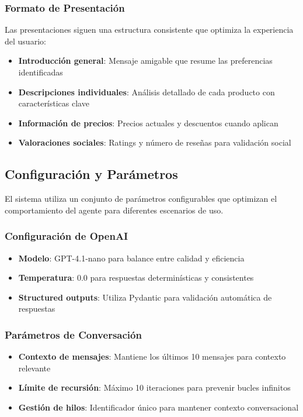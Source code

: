 \subsubsection{Formato de Presentación}

Las presentaciones siguen una estructura consistente que optimiza la experiencia del usuario:

\begin{itemize}
    \item \textbf{Introducción general}: Mensaje amigable que resume las preferencias identificadas
    \item \textbf{Descripciones individuales}: Análisis detallado de cada producto con características clave
    \item \textbf{Información de precios}: Precios actuales y descuentos cuando aplican
    \item \textbf{Valoraciones sociales}: Ratings y número de reseñas para validación social
\end{itemize}

\subsection{Configuración y Parámetros}

El sistema utiliza un conjunto de parámetros configurables que optimizan el comportamiento del agente para diferentes escenarios de uso.

\subsubsection{Configuración de OpenAI}

\begin{itemize}
    \item \textbf{Modelo}: GPT-4.1-nano para balance entre calidad y eficiencia
    \item \textbf{Temperatura}: 0.0 para respuestas determinísticas y consistentes
    \item \textbf{Structured outputs}: Utiliza Pydantic para validación automática de respuestas
\end{itemize}

\subsubsection{Parámetros de Conversación}

\begin{itemize}
    \item \textbf{Contexto de mensajes}: Mantiene los últimos 10 mensajes para contexto relevante
    \item \textbf{Límite de recursión}: Máximo 10 iteraciones para prevenir bucles infinitos
    \item \textbf{Gestión de hilos}: Identificador único para mantener contexto conversacional
\end{itemize}

